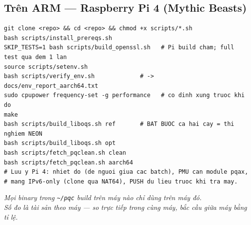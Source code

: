 \documentclass[11pt,a4paper]{article}
\begin{document}
\subsection*{Trên ARM — Raspberry Pi 4 (Mythic Beasts)}
\begin{lstlisting}
git clone <repo> && cd <repo> && chmod +x scripts/*.sh
bash scripts/install_prereqs.sh
SKIP_TESTS=1 bash scripts/build_openssl.sh   # Pi build cham; full test qua dem 1 lan
source scripts/setenv.sh
bash scripts/verify_env.sh             # -> docs/env_report_aarch64.txt
sudo cpupower frequency-set -g performance   # co dinh xung truoc khi do
make
bash scripts/build_liboqs.sh ref       # BAT BUOC ca hai cay = thi nghiem NEON
bash scripts/build_liboqs.sh opt
bash scripts/fetch_pqclean.sh clean
bash scripts/fetch_pqclean.sh aarch64
# Luu y Pi 4: nhiet do (de nguoi giua cac batch), PMU can module pqax,
# mang IPv6-only (clone qua NAT64), PUSH du lieu truoc khi tra may.
\end{lstlisting}

\vfill
\begin{center}\small\itshape
Mọi binary trong \texttt{\textasciitilde/pqc} build trên máy nào chỉ dùng trên máy đó.\\
Số đo là tài sản theo máy — so trực tiếp trong cùng máy, bắc cầu giữa máy bằng tỉ lệ.
\end{center}
\end{document}
